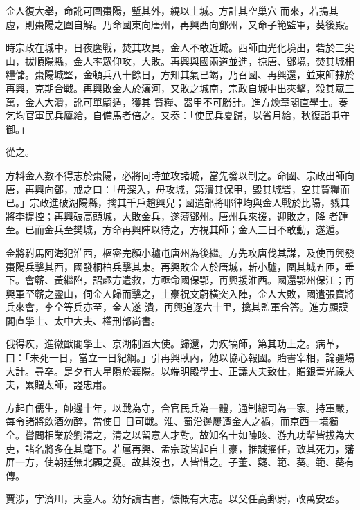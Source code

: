 \begin{pinyinscope}
 金人復大舉，命訛可圍棗陽，塹其外，繞以土城。方計其空巢穴
 而來，若搗其虛，則棗陽之圍自解。乃命國東向唐州，再興西向鄧州，又命子範監軍，葵後殿。



 時宗政在城中，日夜鏖戰，焚其攻具，金人不敢近城。西師由光化境出，砦於三尖山，拔順陽縣，金人率眾仰攻，大敗。再興與國兩道並進，掠唐、鄧境，焚其城柵糧儲。棗陽城堅，金頓兵八十餘日，方知其氣已竭，乃召國、再興還，並東師隸於再興，克期合戰。再興敗金人於瀼河，又敗之城南，宗政自城中出夾擊，殺其眾三萬，金人大潰，訛可單騎遁，獲其
 貲糧、器甲不可勝計。進方煥章閣直學士。奏乞均官軍民兵廩給，自備馬者倍之。又奏：「使民兵夏歸，以省月給，秋復詣屯守御。」



 從之。



 方料金人數不得志於棗陽，必將同時並攻諸城，當先發以制之。命國、宗政出師向唐，再興向鄧，戒之曰：「毋深入，毋攻城，第潰其保甲，毀其城砦，空其貲糧而已。」宗政進破湖陽縣，擒其千戶趙興兒；國遣部將耶律均與金人戰於比陽，戮其將李提控；再興破高頭城，大敗金兵，遂薄鄧州。唐州兵來援，迎敗之，降
 者踵至。已而金兵至樊城，方命再興陣以待之，方視其師；金人三日不敢動，遂遁。



 金將駙馬阿海犯淮西，樞密完顏小驢屯唐州為後繼。方先攻唐伐其謀，及使再興發棗陽兵擊其西，國發桐柏兵擊其東。再興敗金人於唐城，斬小驢，圍其城五匝，垂下。會蘄、黃繼陷，詔趣方遣救，方亟命國保鄂，再興援淮西。國還鄂州保江；再興軍至蘄之靈山，伺金人歸而擊之，土豪祝文蔚橫突入陣，金人大敗，國遣張寶將兵來會，李全等兵亦至，金人遂
 潰，再興追逐六十里，擒其監軍合答。進方顯謨閣直學士、太中大夫、權刑部尚書。



 俄得疾，進徽猷閣學士、京湖制置大使。歸還，力疾犒師，第其功上之。病革，曰：「未死一日，當立一日紀綱。」引再興臥內，勉以協心報國。貽書宰相，論疆場大計。尋卒。是夕有大星隕於襄陽。以端明殿學士、正議大夫致仕，贈銀青光祿大夫，累贈太師，謚忠肅。



 方起自儒生，帥邊十年，以戰為守，合官民兵為一體，通制總司為一家。持軍嚴，每令諸將飲酒勿醉，當使日
 日可戰。淮、蜀沿邊屢遭金人之禍，而京西一境獨全。嘗問相業於劉清之，清之以留意人才對。故知名士如陳晐、游九功輩皆拔為大吏，諸名將多在其麾下。若扈再興、孟宗政皆起自土豪，推誠擢任，致其死力，藩屏一方，使朝廷無北顧之憂。故其沒也，人皆惜之。子董、薿、範、葵。範、葵有傳。



 賈涉，字濟川，天臺人。幼好讀古書，慷慨有大志。以父任高郵尉，改萬安丞。




\end{pinyinscope}
